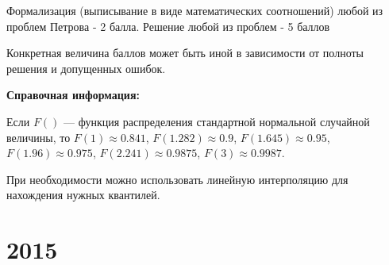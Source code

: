 \documentclass[addpoints, answers]{exam} %
\begin{document}
\begin{questions}
\begin{parts}
\begin{solution}
Формализация (выписывание в виде математических соотношений) любой из проблем Петрова - 2 балла. Решение любой из проблем - 5 баллов

Конкретная величина баллов может быть иной в зависимости от полноты решения и допущенных ошибок.
\end{solution}

\end{parts}



\end{questions}
\textbf{Справочная информация:} 

\vspace{6pt}

Если $F()$ --- функция распределения стандартной нормальной случайной величины, то $F(1)\approx 0.841$, $F(1.282)\approx 0.9$, $F(1.645)\approx 0.95$, $F(1.96)\approx 0.975$, $F(2.241)\approx 0.9875$, $F(3)\approx 0.9987$.

При необходимости можно использовать линейную интерполяцию для нахождения нужных квантилей.

\section{2015}
\end{document}
